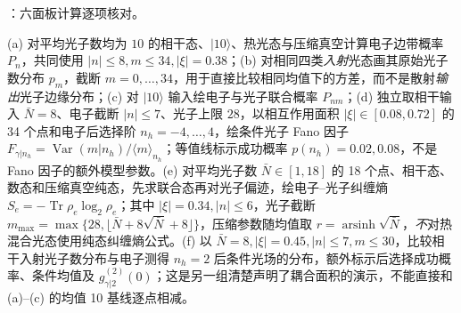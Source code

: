 \noindent {}：六面板计算逐项核对。\par\noindent
(a) 对平均光子数均为 $10$ 的相干态、$|10\rangle$、热光态与压缩真空计算电子边带概率 $P_n$，共同使用 $|n|\le8,m\le34,|\xi|=0.38$；(b) 对相同四类\emph{入射}光态画其原始光子数分布 $p_m$，截断 $m=0,\ldots,34$，用于直接比较相同均值下的方差，而不是散射\emph{输出}光子边缘分布；(c) 对 $|10\rangle$ 输入绘电子与光子联合概率 $P_{nm}$；(d) 独立取相干输入 $\bar N=8$、电子截断 $|n|\le7$、光子上限 $28$，以相互作用面积 $|\xi|\in[0.08,0.72]$ 的 34 个点和电子后选择阶 $n_h=-4,\ldots,4$，绘条件光子 Fano 因子 $F_{\gamma|n_h}=\operatorname{Var}(m|n_h)/\langle m\rangle_{n_h}$；等值线标示成功概率 $p(n_h)=0.02,0.08$，不是 Fano 因子的额外模型参数。(e) 对平均光子数 $\bar N\in[1,18]$ 的 18 个点、相干态、数态和压缩真空纯态，先求联合态再对光子偏迹，绘电子--光子纠缠熵 $S_e=-\operatorname{Tr}\rho_e\log_2\rho_e$；其中 $|\xi|=0.34,|n|\le6$，光子截断 $m_{\max}=\max\{28,\lfloor\bar N+8\sqrt{\bar N}+8\rfloor\}$，压缩参数随均值取 $r=\operatorname{arsinh}\sqrt{\bar N}$，\emph{不}对热混合光态使用纯态纠缠熵公式。(f) 以 $\bar N=8,|\xi|=0.45,|n|\le7,m\le30$，比较相干入射光子数分布与电子测得 $n_h=2$ 后条件光场的分布，额外标示后选择成功概率、条件均值及 $g^{(2)}_{\gamma|2}(0)$；这是另一组清楚声明了耦合面积的演示，不能直接和 (a)--(c) 的均值 10 基线逐点相减。


